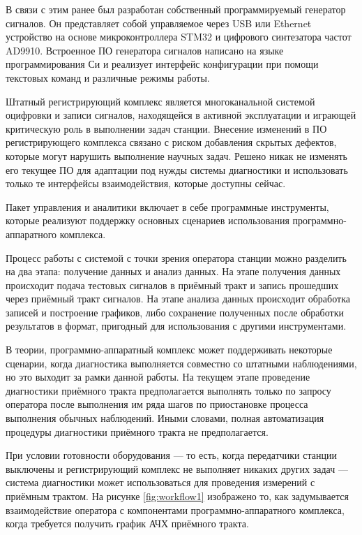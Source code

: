 \documentclass{report}
\begin{document}
В связи с этим ранее был разработан собственный программируемый генератор сигналов. Он представляет собой управляемое через USB или Ethernet устройство на основе микроконтроллера STM32 и цифрового синтезатора частот AD9910. Встроенное ПО генератора сигналов написано на языке программирования Си и реализует интерфейс конфигурации при помощи текстовых команд и различные режимы работы.

Штатный регистрирующий комплекс является многоканальной системой оцифровки и записи сигналов, находящейся в активной эксплуатации и играющей критическую роль в выполнении  задач станции. Внесение изменений в ПО регистрирующего комплекса связано с риском добавления скрытых дефектов, которые могут нарушить выполнение научных задач. Решено никак не изменять его текущее ПО для адаптации под нужды системы диагностики и использовать только те интерфейсы взаимодействия, которые доступны сейчас.

Пакет управления и аналитики включает в себе программные инструменты, которые реализуют поддержку основных сценариев использования программно-аппаратного комплекса.

Процесс работы с системой с точки зрения оператора станции можно разделить на два этапа: получение данных и анализ данных. На этапе получения данных происходит подача тестовых сигналов в приёмный тракт и запись прошедших через приёмный тракт сигналов. На этапе анализа данных происходит обработка записей и построение графиков, либо сохранение полученных после обработки результатов в формат, пригодный для использования с другими инструментами.

В теории, программно-аппаратный комплекс может поддерживать некоторые сценарии, когда диагностика выполняется совместно со штатными наблюдениями, но это выходит за рамки данной работы. На текущем этапе проведение диагностики приёмного тракта предполагается выполнять только по запросу оператора после выполнения им ряда шагов по приостановке процесса выполнения обычных наблюдений. Иными словами, полная автоматизация процедуры диагностики приёмного тракта не предполагается.

При условии готовности оборудования --- то есть, когда передатчики станции выключены и регистрирующий комплекс не выполняет никаких других задач --- система диагностики может использоваться для проведения измерений с приёмным трактом. На рисунке \ref{fig:workflow1} изображено то, как задумывается взаимодействие оператора с компонентами программно-аппаратного комплекса, когда требуется получить график АЧХ приёмного тракта.
\end{document}
